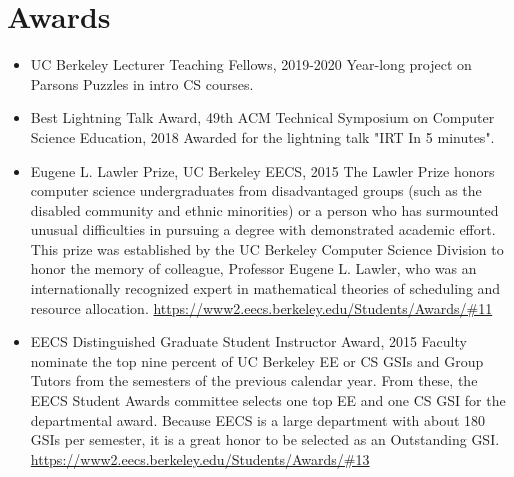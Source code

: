 \section{Awards}
\vspace{6pt}

\begin{itemize}

  \setlength\itemsep{1em}

    \item UC Berkeley Lecturer Teaching Fellows, 2019-2020
    \vspace{2pt}
    \newline\small Year-long project on Parsons Puzzles in intro CS courses.
    \vspace{2pt}
    
    \item Best Lightning Talk Award, 49th ACM Technical Symposium on Computer Science Education, 2018
    \vspace{2pt}
    \newline\small Awarded for the lightning talk "IRT In 5 minutes".
    \vspace{2pt}

    \item Eugene L. Lawler Prize, UC Berkeley EECS, 2015
    \vspace{2pt}
    \newline\small{The Lawler Prize honors computer science undergraduates from disadvantaged groups (such as the disabled community and ethnic minorities) or a person who has surmounted unusual difficulties in pursuing a degree with demonstrated academic effort. This prize was established by the UC Berkeley Computer Science Division to honor the memory of colleague, Professor Eugene L. Lawler, who was an internationally recognized expert in mathematical theories of scheduling and resource allocation.}
    \vspace{2pt}
    \small \href{https://www2.eecs.berkeley.edu/Students/Awards/\#11}{https://www2.eecs.berkeley.edu/Students/Awards/\#11}
    
    \item EECS Distinguished Graduate Student Instructor Award, 2015
    \vspace{2pt}
    \newline
    \small{Faculty nominate the top nine percent of UC Berkeley EE or CS GSIs and Group Tutors from the semesters of the previous calendar year. From these, the EECS Student Awards committee selects one top EE and one CS GSI for the departmental award. Because EECS is a large department with about 180 GSIs per semester, it is a great honor to be selected as an Outstanding GSI.}
    \vspace{2pt}
    \small\href{https://www2.eecs.berkeley.edu/Students/Awards/\#13}{https://www2.eecs.berkeley.edu/Students/Awards/\#13}

\end{itemize}

